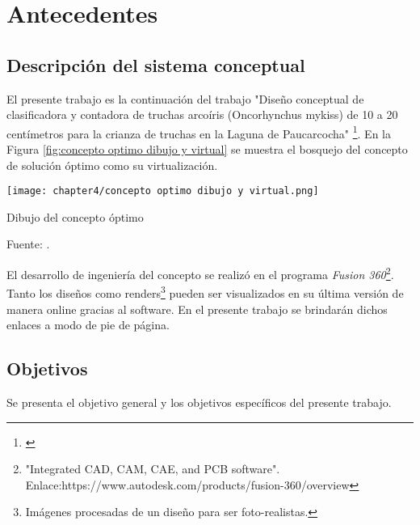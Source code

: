 
\pagestyle{myportland}
\doublespacing
\chapter[----- Antecedentes]{Antecedentes}
\thispagestyle{myportland}

\section{Descripción del sistema conceptual}
\label{sec:descripcion del sistema conceptual}

El presente trabajo es la continuación del trabajo "{Dise{\~{n}}o conceptual de clasificadora y contadora de truchas arco{\'{i}}ris (Oncorhynchus mykiss) de 10 a 20 cent{\'{i}}metros para la crianza de truchas en la Laguna de Paucarcocha}"  \footnote{\cite{DiazVergara2020}}. En la Figura \ref{fig:concepto optimo dibujo y virtual} se muestra el bosquejo del concepto de solución óptimo como su virtualización.

\begin{myfigure}[H]
	\centering
	\texttt{[image: chapter4/concepto optimo dibujo y virtual.png]}
	\caption{Dibujo del concepto óptimo}
	\begin{myflushleftportland}
		Fuente: \cite{DiazVergara2020}.
	\end{myflushleftportland}
	\label{fig:concepto optimo dibujo y virtual}
\end{myfigure}

El desarrollo de ingeniería del concepto se realizó en el programa \textit{Fusion 360}\footnote{"Integrated CAD, CAM, CAE, and PCB software". Enlace:https://www.autodesk.com/products/fusion-360/overview}. Tanto los diseños como renders\footnote{Imágenes procesadas de un diseño para ser foto-realistas.} pueden ser visualizados en su última versión de manera online gracias al software. En el presente trabajo se brindarán dichos enlaces a modo de pie de página.

\section{Objetivos}

Se presenta el objetivo general y los objetivos específicos del presente trabajo.

